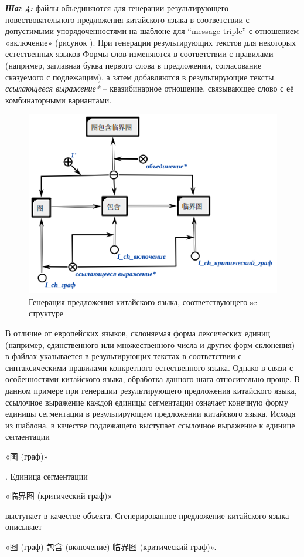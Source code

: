 \textbf{\textit{Шаг 4:}} файлы объединяются для генерации результирующего повествовательного предложения китайского языка в соответствии с допустимыми упорядоченностями на шаблоне для ``message triple'' с отношением «включение» (рисунок \textit{}). При генерации результирующих текстов для некоторых естественных языков Формы слов изменяются в соответствии с правилами (например, заглавная буква первого слова в предложении, согласование сказуемого с подлежащим), а затем добавляются в результирующие тексты. \textit{ссылающееся выражение*} -- квазибинарное отношение, связывающее слово с её комбинаторными вариантами.
\begin{figure}[H]
	\centering
	\includegraphics[scale=0.7]{images/part4/chapter_chinese/chinese_sentence_generated.png}
	\caption{Генерация предложения китайского языка, соответствующего sc-структуре}
	\label{fig:sentence-generated}
\end{figure}

В отличие от европейских языков, склоняемая форма лексических единиц (например, единственного или множественного числа и других форм склонения) в файлах указывается в результирующих текстах в соответствии с синтаксическими правилами конкретного естественного языка. Однако в связи с особенностями китайского языка, обработка данного шага относительно проще. В данном примере при генерации результирующего предложения китайского языка, ссылочное выражение каждой единицы сегментации означает конечную форму единицы сегментации в результирующем предложении китайского языка. Исходя из шаблона, в качестве подлежащего выступает ссылочное выражение к единице сегментации \begin{CJK}{UTF8}{gbsn} «图 (граф)» \end{CJK}. Единица сегментации \begin{CJK}{UTF8}{gbsn} «临界图 (критический граф)» \end{CJK} выступает в качестве объекта. Сгенерированное предложение китайского языка описывает \begin{CJK}{UTF8}{gbsn}«图 (граф) 包含 (включение) 临界图 (критический граф)». \end{CJK}

